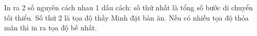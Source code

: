 In ra 2 số nguyên cách nhau 1 dấu cách: số thứ nhất là tổng số bước di chuyển tối thiểu. Số thứ 2 là tọa độ thầy Minh đặt bàn ăn. Nếu có nhiều tọa độ thỏa mãn thì in ra tọa độ bế nhất.